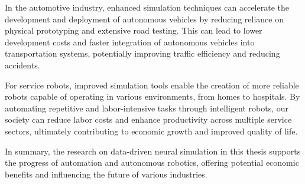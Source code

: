 In the automotive industry, enhanced simulation techniques can accelerate the development and deployment of autonomous vehicles by reducing reliance on physical prototyping and extensive road testing. This can lead to lower development costs and faster integration of autonomous vehicles into transportation systems, potentially improving traffic efficiency and reducing accidents.

For service robots, improved simulation tools enable the creation of more reliable robots capable of operating in various environments, from homes to hospitals. By automating repetitive and labor-intensive tasks through intelligent robots, our society can reduce labor costs and enhance productivity across multiple service sectors, ultimately contributing to economic growth and improved quality of life.

In summary, the research on data-driven neural simulation in this thesis supports the progress of automation and autonomous robotics, offering potential economic benefits and influencing the future of various industries.